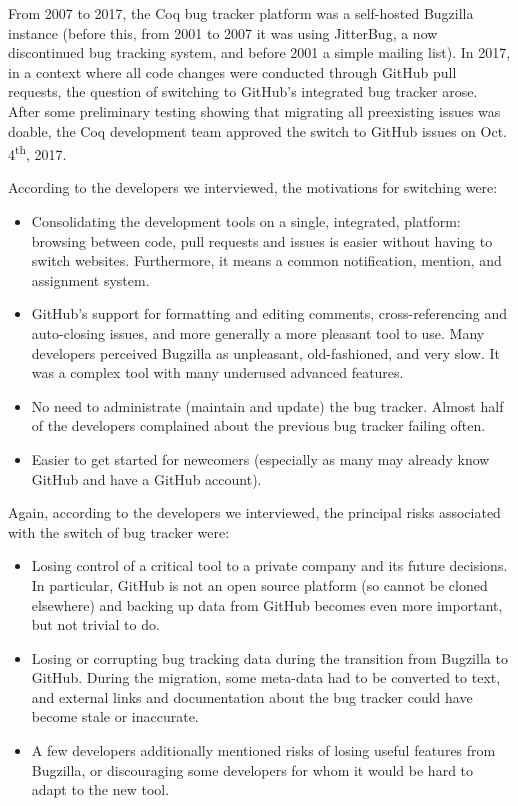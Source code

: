 \documentclass[conference]{IEEEtran}
\begin{document}
From 2007 to 2017, the Coq bug tracker platform was a self-hosted Bugzilla instance (before this, from 2001 to 2007 it was using JitterBug, a now discontinued bug tracking system, and before 2001 a simple mailing list). In 2017, in a context where all code changes were conducted through GitHub pull requests, the question of switching to GitHub's integrated bug tracker arose.
After some preliminary testing showing that migrating all preexisting issues was doable, the Coq development team approved the switch to GitHub issues on Oct. 4\textsuperscript{th}, 2017.

According to the developers we interviewed, the motivations for switching were:
\begin{itemize}
\item Consolidating the development tools on a single, integrated, platform: browsing between code, pull requests and issues is easier without having to switch websites. Furthermore, it means a common notification, mention, and assignment system.
\item GitHub's support for formatting and editing comments, cross-referencing and auto-closing issues, and more generally a more pleasant tool to use. Many developers perceived Bugzilla as unpleasant, old-fashioned, and very slow. It was a complex tool with many underused advanced features.
\item No need to administrate (maintain and update) the bug tracker. Almost half of the developers complained about the previous bug tracker failing often.
\item Easier to get started for newcomers (especially as many may already know GitHub and have a GitHub account).
\end{itemize}

Again, according to the developers we interviewed, the principal risks associated with the switch of bug tracker were:
\begin{itemize}
\item Losing control of a critical tool to a private company and its future decisions. In particular, GitHub is not an open source platform (so cannot be cloned elsewhere) and backing up data from GitHub becomes even more important, but not trivial to do.
\item Losing or corrupting bug tracking data during the transition from Bugzilla to GitHub.
During the migration, some meta-data had to be converted to text, and external links and documentation about the bug tracker could have become stale or inaccurate.
\item A few developers additionally mentioned risks of losing useful features from Bugzilla, or discouraging some developers for whom it would be hard to adapt to the new tool.
\end{itemize}
\end{document}
